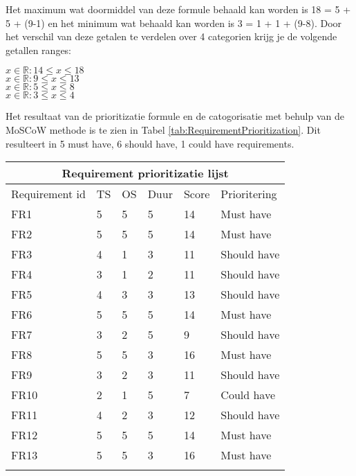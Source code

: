\whitespace
Het maximum wat doormiddel van deze formule behaald kan worden is 18 = 5 + 5 + (9-1) en het minimum wat behaald kan worden is 3 = 1 + 1 + (9-8).
Door het verschil van deze getalen te verdelen over 4 categorien krijg je de volgende getallen ranges:

\whitespace
{} $ x \in \mathbb{R} : 14 \leq x \leq 18 $ \\
 $ x \in \mathbb{R} : 9 \leq x \leq 13 $ \\
 $ x \in \mathbb{R} :  5 \leq x \leq 8 $ \\
 $ x \in \mathbb{R} : 3 \leq x \leq 4 $

\whitespace
Het resultaat van de prioritizatie formule en de catogorisatie met behulp van de MoSCoW methode is te zien in Tabel \ref{tab:RequirementPrioritization}. %
Dit resulteert in 5 must have, 6 should have, 1 could have requirements.

\whitespace
\begin{tabular}{ |p{3cm}||p{1cm}|p{1cm}|p{1cm}|p{1.5cm}|p{2.5cm}| }
    	\hline
	\multicolumn{6}{|c|}{Requirement prioritizatie lijst}  \\
	\hline
	Requirement id & TS & OS & Duur & Score & Prioritering \\
	\hline
	FR1            & 5  & 5  & 5    & 14    & Must have    \\
	FR2            & 5  & 5  & 5    & 14    & Must have    \\
	FR3            & 4  & 1  & 3    & 11    & Should have  \\
	FR4            & 3  & 1  & 2    & 11    & Should have  \\
	FR5            & 4  & 3  & 3    & 13    & Should have  \\
	FR6            & 5  & 5  & 5    & 14    & Must have    \\
	FR7            & 3  & 2  & 5    & 9     & Should have  \\
	FR8            & 5  & 5  & 3    & 16    & Must have    \\
	FR9            & 3  & 2  & 3    & 11    & Should have  \\
	FR10           & 2  & 1  & 5    & 7     & Could have   \\
	FR11           & 4  & 2  & 3    & 12    & Should have  \\
	FR12           & 5  & 5  & 5    & 14    & Must have    \\
	FR13           & 5  & 5  & 3    & 16    & Must have    \\
	\hline
\label{tab:RequirementPrioritization}

\end{tabular}
